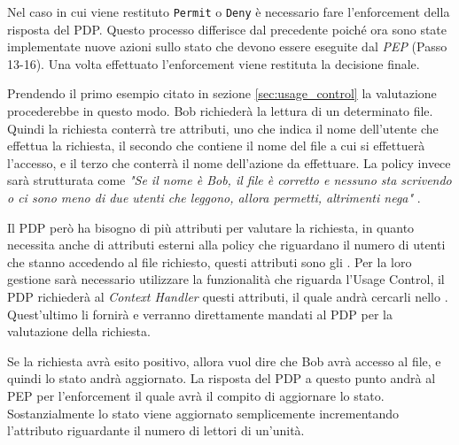Nel caso in cui viene restituto \texttt{Permit} o \texttt{Deny} è necessario fare l'enforcement della risposta del PDP. Questo processo differisce dal precedente poiché ora sono state implementate nuove azioni sullo stato che devono essere eseguite dal \textit{PEP} (Passo 13-16). Una volta effettuato l'enforcement viene restituta la decisione finale.\\ \par
Prendendo il primo esempio citato in sezione \ref{sec:usage_control} la valutazione procederebbe in questo modo. Bob richiederà la lettura di un determinato file. Quindi la richiesta conterrà tre attributi, uno che indica il nome dell'utente che effettua la richiesta, il secondo che contiene il nome del file a cui si effettuerà l'accesso, e il terzo che conterrà il nome dell'azione da effettuare. La policy invece sarà strutturata come \textit{"Se il nome è Bob, il file è corretto e nessuno sta scrivendo o ci sono meno di due utenti che leggono, allora permetti, altrimenti nega" }.\\ \par
Il PDP però ha bisogno di più attributi per valutare la richiesta, in quanto necessita anche di attributi esterni alla policy che riguardano il numero di utenti che stanno accedendo al file richiesto, questi attributi sono gli \statusattribute. Per la loro gestione sarà necessario utilizzare la funzionalità che riguarda l'Usage Control, il PDP richiederà al \textit{Context Handler} questi attributi, il quale andrà cercarli nello \status. Quest'ultimo li fornirà e verranno direttamente mandati al PDP per la valutazione della richiesta.\\ \par
Se la richiesta avrà esito positivo, allora vuol dire che Bob avrà accesso al file, e quindi lo stato andrà aggiornato. La risposta del PDP a questo punto andrà al PEP per l'enforcement il quale avrà il compito di aggiornare lo stato. Sostanzialmente lo stato viene aggiornato semplicemente incrementando l'attributo riguardante il numero di lettori di un'unità.




